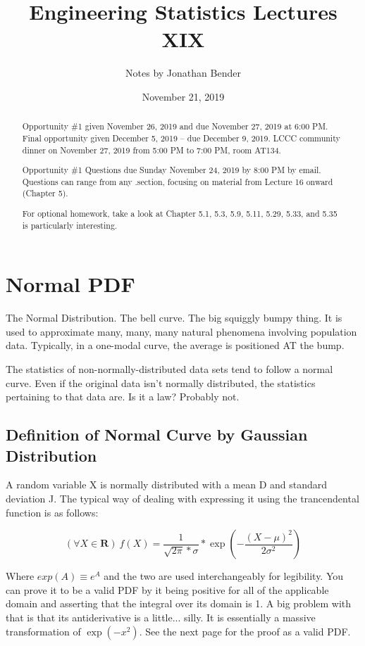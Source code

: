 \documentclass[]{article}
\title{Engineering Statistics Lectures XIX}
\author{Notes by Jonathan Bender}
\date{November 21, 2019}
\begin{document}
	
	\maketitle
	
	\begin{abstract}
		Opportunity \#1 given November 26, 2019 and due November 27, 2019 at 6:00 PM.
		Final opportunity given December 5, 2019 -- due December 9, 2019.
		LCCC community dinner on November 27, 2019 from 5:00 PM to 7:00 PM, room AT134.
		
		Opportunity \#1 Questions due Sunday November 24, 2019 by 8:00 PM by email. Questions can range from any .section, focusing on material from Lecture 16 onward (Chapter 5).
		
		For optional homework, take a look at Chapter 5.1, 5.3, 5.9, 5.11, 5.29, 5.33, and 5.35 is particularly interesting.
	\end{abstract}

	\section{Normal PDF}
		The Normal Distribution. The bell curve. The big squiggly bumpy thing. It is used to approximate many, many, many natural phenomena involving population data. Typically, in a one-modal curve, the average is positioned AT the bump.
		
		The statistics of non-normally-distributed data sets tend to follow a normal curve. Even if the original data isn't normally distributed, the statistics pertaining to that data are. Is it a law? Probably not. 
		
		\subsection{Definition of Normal Curve by Gaussian Distribution}
			A random variable X is normally distributed with a mean D and standard deviation J.
			The typical way of dealing with expressing it using the trancendental function is as follows:
			
			$$(\forall X\in \mathbf{R})\ f(X) = \dfrac{1}{\sqrt{2\pi}*\sigma} * \exp{(-\dfrac{(X-\mu)^2}{2\sigma^2})}$$
			
			Where $exp(A) \equiv e^A$ and the two are used interchangeably for legibility. You can prove it to be a valid PDF by it being positive for all of the applicable domain and asserting that the integral over its domain is 1. A big problem with that is that its antiderivative is a little... silly. It is essentially a massive transformation of $\exp{(-x^2)}$. See the next page for the proof as a valid PDF.
			
\end{document}
